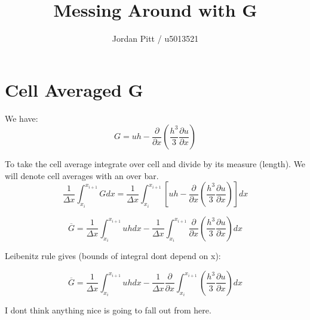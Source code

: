 \documentclass[12pt]{article}
\begin{document}
\title{Messing Around with G}
\author{Jordan Pitt / u5013521}

\section{Cell Averaged G}
We have:
\[G = uh - \frac{\partial}{\partial x} \left(\frac{h^3}{3} \frac{\partial u}{\partial x}\right)\]

To take the cell average integrate over cell and divide by its measure (length). We will denote cell averages with an over bar.
\[ \frac{1}{\Delta x} \int_{x_i}^{x_{i+1}} G dx =\frac{1}{\Delta x} \int_{x_i}^{x_{i+1}} \left[uh - \frac{\partial}{\partial x} \left(\frac{h^3}{3} \frac{\partial u}{\partial x}\right)\right]  dx \]

\[ \overline{G} =\frac{1}{\Delta x} \int_{x_i}^{x_{i+1}} uh dx - \frac{1}{\Delta x} \int_{x_i}^{x_{i+1}} \frac{\partial}{\partial x} \left(\frac{h^3}{3} \frac{\partial u}{\partial x}\right)  dx \]

Leibenitz rule gives (bounds of integral dont depend on x):

\[ \overline{G} =\frac{1}{\Delta x} \int_{x_i}^{x_{i+1}} uh dx - \frac{1}{\Delta x} \frac{\partial}{\partial x} \int_{x_i}^{x_{i+1}} \left(\frac{h^3}{3} \frac{\partial u}{\partial x}\right)  dx \]

I dont think anything nice is going to fall out from here.
\end{document}
